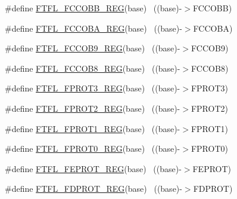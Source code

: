 \begin{DoxyCompactItemize}
\item 
\#define \hyperlink{group___f_t_f_l___register___accessor___macros_ga3dae4e4d06922c93a79de6c1e2eee6e5}{F\+T\+F\+L\+\_\+\+F\+C\+C\+O\+B\+B\+\_\+\+R\+EG}(base)                                    ~((base)-\/$>$F\+C\+C\+O\+BB)
\item 
\#define \hyperlink{group___f_t_f_l___register___accessor___macros_ga694b40aa4457cef10f42dedada1ae800}{F\+T\+F\+L\+\_\+\+F\+C\+C\+O\+B\+A\+\_\+\+R\+EG}(base)                                    ~((base)-\/$>$F\+C\+C\+O\+BA)
\item 
\#define \hyperlink{group___f_t_f_l___register___accessor___macros_ga74b5065eee73b2f0cf777d95ef32eaf9}{F\+T\+F\+L\+\_\+\+F\+C\+C\+O\+B9\+\_\+\+R\+EG}(base)                                    ~((base)-\/$>$F\+C\+C\+O\+B9)
\item 
\#define \hyperlink{group___f_t_f_l___register___accessor___macros_ga5121541dc5124f6d4dbf91c6ff37f4eb}{F\+T\+F\+L\+\_\+\+F\+C\+C\+O\+B8\+\_\+\+R\+EG}(base)                                    ~((base)-\/$>$F\+C\+C\+O\+B8)
\item 
\#define \hyperlink{group___f_t_f_l___register___accessor___macros_ga3e7662648ae40179bc1b22849a460b6a}{F\+T\+F\+L\+\_\+\+F\+P\+R\+O\+T3\+\_\+\+R\+EG}(base)                                    ~((base)-\/$>$F\+P\+R\+O\+T3)
\item 
\#define \hyperlink{group___f_t_f_l___register___accessor___macros_ga3d2ae39f0e6774e167ee98627f68dd7a}{F\+T\+F\+L\+\_\+\+F\+P\+R\+O\+T2\+\_\+\+R\+EG}(base)                                    ~((base)-\/$>$F\+P\+R\+O\+T2)
\item 
\#define \hyperlink{group___f_t_f_l___register___accessor___macros_ga85bbb8d73e9e3ed4ef8a2092ad6e9f8f}{F\+T\+F\+L\+\_\+\+F\+P\+R\+O\+T1\+\_\+\+R\+EG}(base)                                    ~((base)-\/$>$F\+P\+R\+O\+T1)
\item 
\#define \hyperlink{group___f_t_f_l___register___accessor___macros_gadbe6ebb9c0f6665200249c5295cc8947}{F\+T\+F\+L\+\_\+\+F\+P\+R\+O\+T0\+\_\+\+R\+EG}(base)                                    ~((base)-\/$>$F\+P\+R\+O\+T0)
\item 
\#define \hyperlink{group___f_t_f_l___register___accessor___macros_ga35c7eb7ca866e4e5743e81f5a523e402}{F\+T\+F\+L\+\_\+\+F\+E\+P\+R\+O\+T\+\_\+\+R\+EG}(base)                                    ~((base)-\/$>$F\+E\+P\+R\+OT)
\item 
\#define \hyperlink{group___f_t_f_l___register___accessor___macros_ga317742f25d2e4ee9faa22f74f930ef61}{F\+T\+F\+L\+\_\+\+F\+D\+P\+R\+O\+T\+\_\+\+R\+EG}(base)                                    ~((base)-\/$>$F\+D\+P\+R\+OT)

\end{DoxyCompactItemize}
